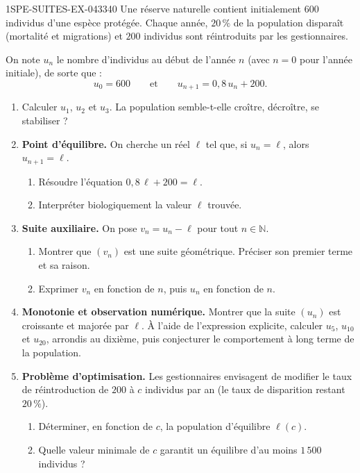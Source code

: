 \begin{exercice}{1SPE-SUITES-EX-043}{3}{40}
Une réserve naturelle contient initialement $600$ individus d'une espèce protégée. Chaque année, $20\,\%$ de la population disparaît (mortalité et migrations) et $200$ individus sont réintroduits par les gestionnaires.

On note $u_n$ le nombre d'individus au début de l'année $n$ (avec $n = 0$ pour l'année initiale), de sorte que :
\[
  u_0 = 600 \qquad \text{et} \qquad u_{n+1} = 0{,}8\, u_n + 200.
\]

\begin{enumerate}
  \item Calculer $u_1$, $u_2$ et $u_3$. La population semble-t-elle croître, décroître, se stabiliser ?

  \item \textbf{Point d'équilibre.} On cherche un réel $\ell$ tel que, si $u_n = \ell$, alors $u_{n+1} = \ell$.
  \begin{enumerate}
    \item Résoudre l'équation $0{,}8\,\ell + 200 = \ell$.
    \item Interpréter biologiquement la valeur $\ell$ trouvée.
  \end{enumerate}

  \item \textbf{Suite auxiliaire.} On pose $v_n = u_n - \ell$ pour tout $n \in \mathbb{N}$.
  \begin{enumerate}
    \item Montrer que $(v_n)$ est une suite géométrique. Préciser son premier terme et sa raison.
    \item Exprimer $v_n$ en fonction de $n$, puis $u_n$ en fonction de $n$.
  \end{enumerate}

  \item \textbf{Monotonie et observation numérique.} Montrer que la suite $(u_n)$ est croissante et majorée par $\ell$. À l'aide de l'expression explicite, calculer $u_5$, $u_{10}$ et $u_{20}$, arrondis au dixième, puis conjecturer le comportement à long terme de la population.

  \item \textbf{Problème d'optimisation.} Les gestionnaires envisagent de modifier le taux de réintroduction de $200$ à $c$ individus par an (le taux de disparition restant $20\,\%$).
  \begin{enumerate}
    \item Déterminer, en fonction de $c$, la population d'équilibre $\ell(c)$.
    \item Quelle valeur minimale de $c$ garantit un équilibre d'au moins $1\,500$ individus ?
  \end{enumerate}
\end{enumerate}
\end{exercice}
